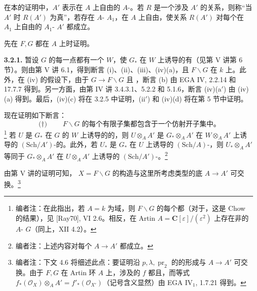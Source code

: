 在本的证明中，$A'$ 表示在 $A$ 上自由的 $A$-。若 $R$ 是一个涉及 $A'$ 的关系，则称“当 $A'$ 时 $R(A')$ 为真”，若存在 $A$- $A_1$，在 $A$ 上自由，使关系 $R(A')$ 对每个在 $A_1$ 上自由的 $A_1$- $A'$ 都成立。

先在 $F,G$ 都在 $A$ 上时证明。

\textbf{3.2.1.} 暂设 $G$ 的每一点都有一个 $W$，使 $G_*$ 在 $W$ 上诱导的有（见第 V 讲第 6 节）。则由第 V 讲 6.1，得到断言 (i)、(ii)、(iii)、(iv)(a)，且 $F\backslash G$ 在 $k$ 上。此外，在 (iv) 的假设下，由于 $G\to F\backslash G$ 且
，断言 (b) 由 EGA IV, 2.2.14 和 17.7.7 得到。另一方面，由第 IV 讲 3.4.3.1、5.2.2 和 5.1.6，断言 (iv)(a$'$) 由 (iv)(a) 得到。最后，(iv)(c) 将在 3.2.5 中证明，(ii$'$) 和 (iv)(d) 将在第 5 节中证明。

现在证明如下断言：
\[
\text{($\dagger$)}\qquad F\backslash G\text{ 的每个有限子集都包含于一个仿射开子集中。}
\]
\footnote{编者注：在此指出，若 $A=k$ 为域，则 $F\backslash G$ 的每个都（对于，这是 Chow 的结果），见 [Ray70], VI 2.6。相反，在 Artin  $A=\mathbf C[\varepsilon]/(\varepsilon^2)$ 上存在非的 $A$- $G$（同上，XII 4.2）。}
若 $U$ 是 $G_*$ 在 $G$ 的 $W$ 上诱导的的，则 $U\otimes_A A'$ 是 $G_*\otimes_A A'$ 在 $W\otimes_A A'$ 上诱导的 $(\mathrm{Sch}/A')$-的。此外，若 $U_*$ 是 $G_*$ 在 $U$ 上诱导的 $(\mathrm{Sch}/A)$-，则 $U_*\otimes_A A'$ 等同于 $G_*\otimes_A A'$ 在 $U\otimes_A A'$ 上诱导的 $(\mathrm{Sch}/A')$-。\footnote{编者注：上述内容对每个 $A\to A'$ 都成立。}

由第 V 讲的证明可知， $X=F\backslash G$ 的构造与这里所考虑类型的底 $A\to A'$ 可交换。\footnote{编者注：下文 4.6 将细述此点：要证明沿 $p,\lambda,\operatorname{pr}_2$ 的的形成与 $A\to A'$ 可交换。由于 $F,G$ 在 Artin 环 $A$ 上，涉及的 $f$ 都且，而等式 $f_*(\mathcal O_X)\otimes_A A'=f'_*(\mathcal O_{X'})$（记号含义显然）由 EGA IV$_1$, 1.7.21 得到。}

